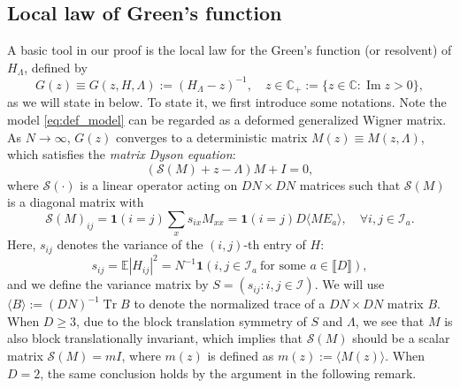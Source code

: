 \documentclass[10pt,reqno]{amsart}
\numberwithin{equation}{section}
\numberwithin{figure}{section}
\theoremstyle{plain} %
\theoremstyle{definition} %
\newcommand{\cal}{\mathcal}
\newcommand{\E}{\mathbb{E}}
\newcommand{\C}{\mathbb{C}}
\newcommand{\avg}[1]{\langle #1 \rangle}
\DeclareMathOperator{\tr}{\mathrm{Tr}}
\DeclareMathOperator{\im}{\mathrm{Im}}
\newcommand{\be}{\begin{equation}}
\newcommand{\ee}{\end{equation}}
\numberwithin{equation}{section}
\begin{document}
\subsection{Local law of Green's function}

A basic tool in our proof is the local law for the Green's function (or resolvent) of $H_\Lambda$, defined by
\be\label{def_resolv}
G(z)\equiv G(z,H,\Lambda):=(H_\Lambda-z)^{-1},\quad z\in \mathbb C_+:=\{z\in \C:\im z>0\},
\ee
as we will state in  below. To state it, we first introduce some notations. Note the model \eqref{eq:def_model} can be regarded as a deformed generalized Wigner matrix. As $N\to \infty$, $G(z)$ converges to a deterministic matrix $M(z)\equiv M(z,\Lambda)$, which satisfies the \emph{matrix Dyson equation}: 
\be\label{def_M}
\left( \cal S(M) +z-\Lambda\right)M+I=0, 
\ee
where $\cal S(\cdot)$ is a linear operator acting on $DN\times DN$ matrices such that $\cal S(M)$ is a diagonal matrix with 
$$\cal S(M)_{ij}=\mathbf 1(i=j)\sum_x s_{ix}M_{xx} =\mathbf 1(i=j)D\avg{ME_a},\quad \forall i,j\in \cal I_a. $$
Here, $s_{ij}$ denotes the variance of the $(i,j)$-th entry of $H$:
\be\label{eq:sij}
s_{ij}=\E|H_{ij}|^2= N^{-1}\mathbf 1(i,j\in \cal I_a \  \text{for some } a \in \llbracket D\rrbracket),
\ee
and we define the variance matrix by $S=(s_{ij}:i,j\in \cal I)$. We will use $\langle B\rangle := (DN)^{-1}\tr B$ to denote the normalized trace of a $DN\times DN$ matrix $B$. 
When $D\ge 3$, due to the block translation symmetry of $S$ and $\Lambda$, we see that $M$ is also block translationally invariant, which implies that $\cal S(M)$ should be a scalar matrix
$\cal S(M)=mI$, where $m(z)$ is defined as $m(z):=\langle M(z)\rangle$. When $D=2$, the same conclusion holds by the argument in the following remark.
\end{document}
